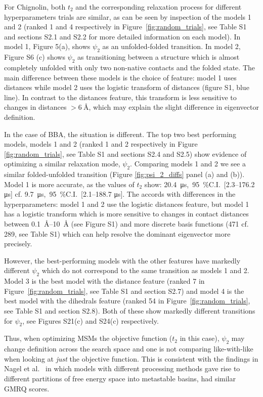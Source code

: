 \documentclass[journal=jacsat,manuscript=article]{achemso}
\newcommand{\SIci}[4]{\SI{#1}{#4},\ \SI{95}{\percent}C.I.\ [\numrange[range-phrase=---]{#2}{#3} \si{#4}]}
\begin{document}
For Chignolin, both $t_2$ and the corresponding relaxation process for different hyperparameters trials are similar, as can be seen by inspection of the models 1 and 2 (ranked 1 and 4 respectively in Figure~\ref{fig:random_trials}, see Table S1 and sections S2.1 and S2.2 for more detailed information on each model).  In model 1, Figure 5(a), shows $\psi_2$ as an unfolded-folded transition.  In model 2, Figure S6 (c) shows $\psi_2$ as transitioning between a structure which is almost completely unfolded with only two non-native contacts and the folded state. The main difference between these models is the choice of feature: model 1 uses distances while model 2 uses the logistic transform of distances (figure S1, blue line). In contrast to the distances feature, this transform is less sensitive to changes in distances $>\SI{6}{\angstrom}$, which may explain the slight difference in eigenvector definition. 

In the case of BBA, the situation is different. The top two best performing models, models 1 and 2 (ranked 1 and 2 respectively in Figure \ref{fig:random_trials}, see Table S1 and sections S2.4 and S2.5) show evidence of optimizing a similar relaxation mode, $\psi_2$.  Comparing models 1 and 2 we see a similar folded-unfolded transition (Figure \ref{fig:psi_2_diffs} panel (a) and (b)). Model 1 is more accurate, as the values of $t_2$ show: \SIci{20.4}{2.3}{176.2}{\micro\second} cf. \SIci{9.7}{2.1}{188.7}{\micro\second}. The accords with differences in the hyperparameters: model 1 and 2 use the logistic distances feature, but model 1 has a logistic transform which is more sensitive to changes in contact distances between \SIrange[range-phrase=---]{0.1}{10}{\angstrom} (see Figure S1) and more discrete basis functions (471 cf. 289, see Table S1) which can help resolve the dominant eigenvector more precisely. 

However, the best-performing models with the other features have markedly different $\psi_2$ which do not correspond to the same transition as models 1 and 2.  Model 3 is the best model with the distance feature (ranked 7 in Figure~\ref{fig:random_trials}, see Table S1 and section S2.7) and model 4 is the best model with the dihedrals feature (ranked 54 in Figure~\ref{fig:random_trials}, see Table S1 and section S2.8). Both of these show markedly different transitions for $\psi_2$, see Figures S21(c) and S24(c) respectively. 

Thus, when optimizing MSMs the objective function ($t_2$ in this case), $\psi_2$ may change definition across the search space and one is not comparing like-with-like when looking at \emph{just} the objective function.  This is consistent with the findings in Nagel et al.~\cite{nagelBenchmarkMarkovState2023} in which models with different processing methods gave rise to different partitions of free energy space into metastable basins, had similar GMRQ scores.  
\end{document}

